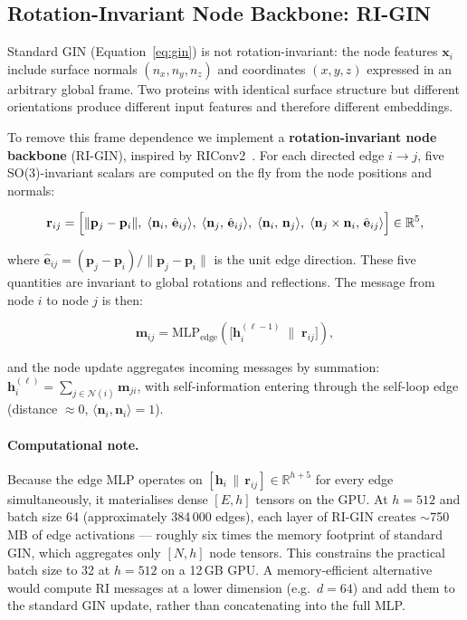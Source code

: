 \subsection{Rotation-Invariant Node Backbone: RI-GIN}
\label{sec:arch:rigin}

Standard GIN (Equation~\ref{eq:gin}) is not rotation-invariant: the node
features $\mathbf{x}_i$ include surface normals $(n_x, n_y, n_z)$ and
coordinates $(x, y, z)$ expressed in an arbitrary global frame.
Two proteins with identical surface structure but different orientations
produce different input features and therefore different embeddings.

To remove this frame dependence we implement a \textbf{rotation-invariant
node backbone} (RI-GIN), inspired by RIConv2~\cite{riconv2}.
For each directed edge $i \to j$, five SO(3)-invariant scalars are computed
on the fly from the node positions and normals:

\begin{equation}
  \mathbf{r}_{ij} = \Bigl[
    \|\mathbf{p}_j - \mathbf{p}_i\|,\;
    \langle \mathbf{n}_i,\, \hat{\mathbf{e}}_{ij} \rangle,\;
    \langle \mathbf{n}_j,\, \hat{\mathbf{e}}_{ij} \rangle,\;
    \langle \mathbf{n}_i,\, \mathbf{n}_j \rangle,\;
    \langle \mathbf{n}_j \times \mathbf{n}_i,\, \hat{\mathbf{e}}_{ij} \rangle
  \Bigr] \in \mathbb{R}^5,
  \label{eq:ri_scalars}
\end{equation}

where $\hat{\mathbf{e}}_{ij} = (\mathbf{p}_j - \mathbf{p}_i) /
\|\mathbf{p}_j - \mathbf{p}_i\|$ is the unit edge direction.
These five quantities are invariant to global rotations and reflections.
The message from node $i$ to node $j$ is then:

\begin{equation}
  \mathbf{m}_{ij} = \mathrm{MLP}_\text{edge}
    \!\left(\bigl[\mathbf{h}_i^{(\ell-1)} \;\|\; \mathbf{r}_{ij}\bigr]\right),
  \label{eq:ri_msg}
\end{equation}

and the node update aggregates incoming messages by summation:
$\mathbf{h}_i^{(\ell)} = \sum_{j \in \mathcal{N}(i)} \mathbf{m}_{ji}$,
with self-information entering through the self-loop edge (distance $\approx 0$,
$\langle \mathbf{n}_i, \mathbf{n}_i \rangle = 1$).

\paragraph{Computational note.}
Because the edge MLP operates on $[\mathbf{h}_i \,\|\, \mathbf{r}_{ij}] \in
\mathbb{R}^{h+5}$ for every edge simultaneously, it materialises dense
$[E, h]$ tensors on the GPU.
At $h = 512$ and batch size 64 (approximately 384\,000 edges), each layer
of RI-GIN creates $\sim$750\,MB of edge activations --- roughly six times
the memory footprint of standard GIN, which aggregates only $[N, h]$ node
tensors.
This constrains the practical batch size to 32 at $h = 512$ on a 12\,GB
GPU.
A memory-efficient alternative would compute RI messages at a lower
dimension (e.g.\ $d = 64$) and add them to the standard GIN update,
rather than concatenating into the full MLP.

